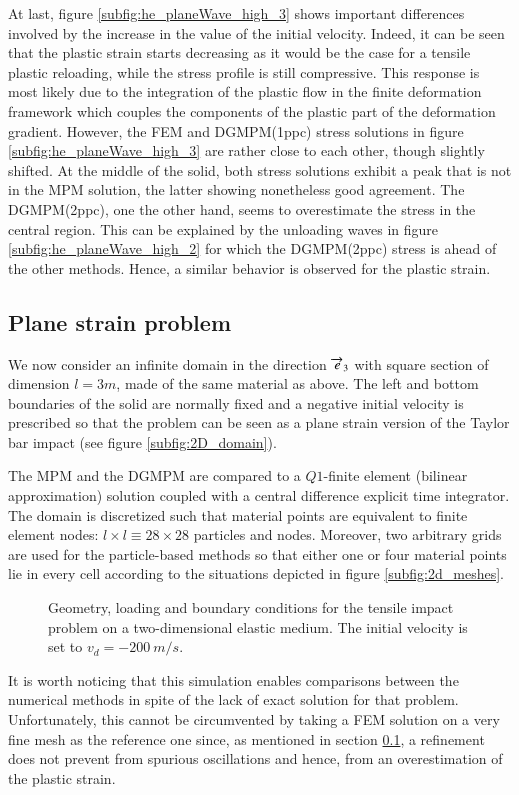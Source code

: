 At last, figure \ref{subfig:he_planeWave_high_3} shows important differences involved by the increase in the value of the initial velocity.
Indeed, it can be seen that the plastic strain starts decreasing as it would be the case for a tensile plastic reloading, while the stress profile is still compressive.
This response is most likely due to the integration of the plastic flow in the finite deformation framework which couples the components of the plastic part of the deformation gradient.
However, the FEM and DGMPM(1ppc) stress solutions in figure \ref{subfig:he_planeWave_high_3} are rather close to each other, though slightly shifted.
At the middle of the solid, both stress solutions exhibit a peak that is not in the MPM solution, the latter showing nonetheless good agreement.
The DGMPM(2ppc), one the other hand, seems to overestimate the stress in the central region.
This can be explained by the unloading waves in figure \ref{subfig:he_planeWave_high_2} for which the DGMPM(2ppc) stress is ahead of the other methods.
Hence, a similar behavior is observed for the plastic strain.

\subsection{Plane strain problem}
\label{sec:plane-strain-problem}
We now consider an infinite domain in the direction ${\overrightarrow{e}}_3$ with square section of dimension $l=3m$, made of the same material as above.
The left and bottom boundaries of the solid are normally fixed and a negative initial velocity is prescribed so that the problem can be seen as a plane strain version of the Taylor bar impact (see figure \ref{subfig:2D_domain}).


The MPM and the DGMPM are compared to a $Q1$-finite element (bilinear approximation) solution coupled with a central difference explicit time integrator.
The domain is discretized such that material points are equivalent to finite element nodes: $l\times l \equiv 28 \times 28$ particles and nodes.
Moreover, two arbitrary grids are used for the particle-based methods so that either one or four material points lie in every cell according to the situations depicted in figure \ref{subfig:2d_meshes}.
\begin{figure}[ht]
  \centering
   \qquad
  \caption{Geometry, loading and boundary conditions for the tensile impact problem on a two-dimensional elastic medium. The initial velocity is set to $v_d=-200 \: m/s$.}
  \label{fig:PS_domain}
\end{figure}
It is worth noticing that this simulation enables comparisons between the numerical methods in spite of the lack of exact solution for that problem.
Unfortunately, this cannot be circumvented by taking a FEM solution on a very fine mesh as the reference one since, as mentioned in section \ref{sec:plane-strain-problem}, a refinement does not prevent from spurious oscillations and hence, from an overestimation of the plastic strain.



